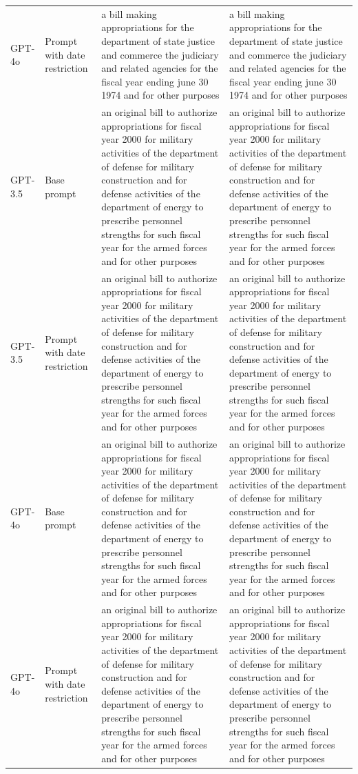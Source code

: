 \begin{longtable}{>{\raggedright\arraybackslash}p{1.4cm}>{\raggedright\arraybackslash}p{1.4cm}>{\raggedright\arraybackslash}p{5.5cm}>{\raggedright\arraybackslash}p{5.5cm}}
GPT-4o & Prompt with date restriction & a bill making appropriations for the department of state justice and commerce the judiciary and related agencies for the fiscal year ending june 30 1974 and for other purposes & a bill making appropriations for the department of state justice and commerce the judiciary and related agencies for the fiscal year ending june 30 1974 and for other purposes\\
GPT-3.5 & Base prompt & an original bill to authorize appropriations for fiscal year 2000 for military activities of the department of defense for military construction and for defense activities of the department of energy to prescribe personnel strengths for such fiscal year for the armed forces and for other purposes & an original bill to authorize appropriations for fiscal year 2000 for military activities of the department of defense for military construction and for defense activities of the department of energy to prescribe personnel strengths for such fiscal year for the armed forces and for other purposes\\
GPT-3.5 & Prompt with date restriction & an original bill to authorize appropriations for fiscal year 2000 for military activities of the department of defense for military construction and for defense activities of the department of energy to prescribe personnel strengths for such fiscal year for the armed forces and for other purposes & an original bill to authorize appropriations for fiscal year 2000 for military activities of the department of defense for military construction and for defense activities of the department of energy to prescribe personnel strengths for such fiscal year for the armed forces and for other purposes\\
GPT-4o & Base prompt & an original bill to authorize appropriations for fiscal year 2000 for military activities of the department of defense for military construction and for defense activities of the department of energy to prescribe personnel strengths for such fiscal year for the armed forces and for other purposes & an original bill to authorize appropriations for fiscal year 2000 for military activities of the department of defense for military construction and for defense activities of the department of energy to prescribe personnel strengths for such fiscal year for the armed forces and for other purposes\\
GPT-4o & Prompt with date restriction & an original bill to authorize appropriations for fiscal year 2000 for military activities of the department of defense for military construction and for defense activities of the department of energy to prescribe personnel strengths for such fiscal year for the armed forces and for other purposes & an original bill to authorize appropriations for fiscal year 2000 for military activities of the department of defense for military construction and for defense activities of the department of energy to prescribe personnel strengths for such fiscal year for the armed forces and for other purposes\\

\end{longtable}
